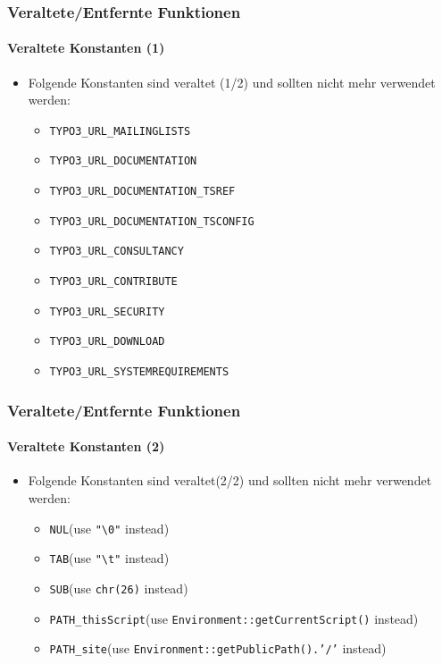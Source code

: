 \begin{frame}[fragile]
	\frametitle{Veraltete/Entfernte Funktionen}
	\framesubtitle{Veraltete Konstanten (1)}

	\begin{itemize}
		\item Folgende Konstanten sind veraltet (1/2)\newline
			und sollten nicht mehr verwendet werden:

			\begin{itemize}\smaller
				\item \texttt{TYPO3\_URL\_MAILINGLISTS}
				\item \texttt{TYPO3\_URL\_DOCUMENTATION}
				\item \texttt{TYPO3\_URL\_DOCUMENTATION\_TSREF}
				\item \texttt{TYPO3\_URL\_DOCUMENTATION\_TSCONFIG}
				\item \texttt{TYPO3\_URL\_CONSULTANCY}
				\item \texttt{TYPO3\_URL\_CONTRIBUTE}
				\item \texttt{TYPO3\_URL\_SECURITY}
				\item \texttt{TYPO3\_URL\_DOWNLOAD}
				\item \texttt{TYPO3\_URL\_SYSTEMREQUIREMENTS}
			\end{itemize}

	\end{itemize}

\end{frame}


\begin{frame}[fragile]
	\frametitle{Veraltete/Entfernte Funktionen}
	\framesubtitle{Veraltete Konstanten (2)}

	\begin{itemize}
		\item Folgende Konstanten sind veraltet(2/2)\newline
			und sollten nicht mehr verwendet werden:

			\begin{itemize}\smaller
				\item \texttt{NUL}\tabto{3cm}(use \texttt{"\textbackslash 0"} instead)
				\item \texttt{TAB}\tabto{3cm}(use \texttt{"\textbackslash t"} instead)
				\item \texttt{SUB}\tabto{3cm}(use \texttt{chr(26)} instead)
				\item \texttt{PATH\_thisScript}\tabto{3cm}(use \texttt{Environment::getCurrentScript()} instead)
				\item \texttt{PATH\_site}\tabto{3cm}(use \texttt{Environment::getPublicPath().'/'} instead)
			\end{itemize}
	\end{itemize}

\end{frame}

